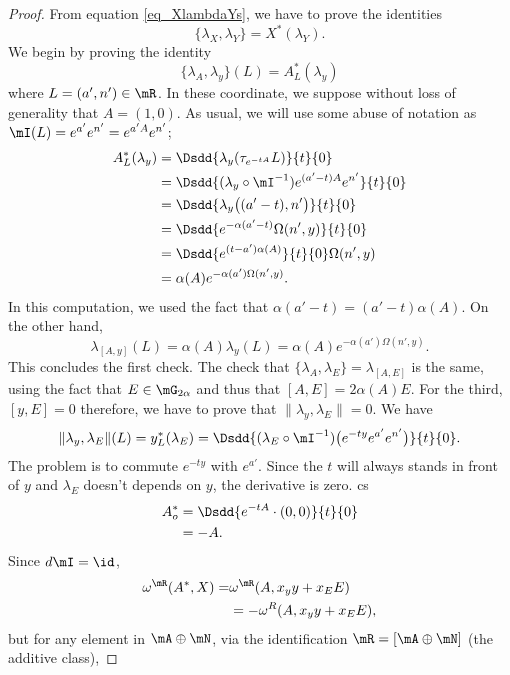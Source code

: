\begin{proof}
	From equation \eqref{eq_XlambdaYs}, we have to prove the identities
	\[
		\{ \lambda_X,\lambda_Y \}=X^*(\lambda_Y).
	\]
	We begin by proving the identity
	\[
		\{ \lambda_A,\lambda_y \}(L)=A^*_L(\lambda_y)
	\]
	where $L=(a',n')\in\mR$. In these coordinate, we suppose without loss of generality that $A=(1,0)$. As usual, we will use some abuse of notation as $\mI(L)= e^{a'} e^{n'}= e^{a'A} e^{n'}$;
	\begin{equation}
		\begin{split}
			A^*_L(\lambda_y)&=\Dsdd{ \lambda_y(\tau_{ e^{-tA}}L) }{t}{0}\\
			&=\Dsdd{ (\lambda_y\circ\mI ^{-1}) e^{(a'-t)A} e^{n'} }{t}{0}\\
			&=\Dsdd{ \lambda_y\big( (a'-t),n' \big) }{t}{0}\\
			&=\Dsdd{  e^{-\alpha(a'-t)}\Omega(n',y) }{t}{0}\\
			&=\Dsdd{  e^{(t-a')\alpha(A)} }{t}{0}\Omega(n',y)\\
			&=\alpha(A) e^{-\alpha(a')\Omega(n',y)}.
		\end{split}
	\end{equation}
	In this computation, we used the fact that $\alpha(a'-t)=(a'-t)\alpha(A)$.
	On the other hand,
	\[
		\lambda_{[A,y]}(L)=\alpha(A)\lambda_y(L)=\alpha(A) e^{-\alpha(a')\Omega(n',y)}.
	\]
	This concludes the first check. The check that $\{ \lambda_A,\lambda_E \}=\lambda_{[A,E]}$ is the same, using the fact that $E\in\mG_{2\alpha}$ and thus that $[A,E]=2\alpha(A)E$. For the third, $[y,E]=0$ therefore, we have to prove that $\| \lambda_y,\lambda_E \|=0$. We have
	\[
		\| \lambda_y,\lambda_E \|(L)=y^*_L(\lambda_E)=\Dsdd{ (\lambda_E\circ\mI^{-1})\big(  e^{-ty} e^{a'} e^{n'} \big) }{t}{0}.
	\]
	The problem is to commute $ e^{-ty}$ with $ e^{a'}$. Since the $t$ will always stands in front of $y$ and $\lambda_E$ doesn't depends on $y$, the derivative is zero.
	cs
	\[
		\begin{split}
			A^*_o&=\Dsdd{  e^{-tA}\cdot(0,0) }{t}{0}\\
			&=-A.
		\end{split}
	\]
	Since $d\mI=\id$,
	\[
		\begin{split}
			\omega^{\mR}(A^*,X)=&\omega^{\mR}(A,x_yy+x_EE)\\
			&=-\omega^{R}(A,x_yy+x_EE),
		\end{split}
	\]
	but for any element in $\mA\oplus\mN$, via the identification $\mR=[\mA\oplus\mN]$ (the additive class),

\end{proof}
